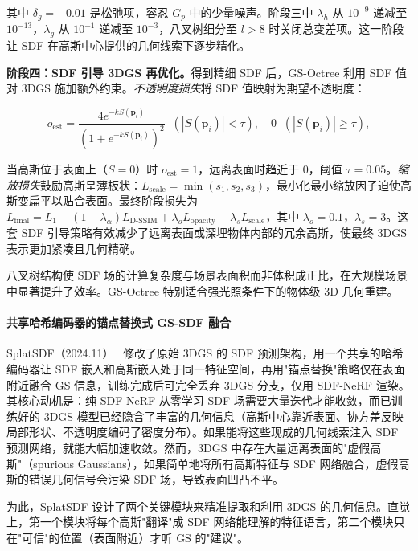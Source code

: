其中 $\delta_g{=}{-}0.01$ 是松弛项，容忍 $G_p$ 中的少量噪声。阶段三中 $\lambda_h$ 从 $10^{-9}$ 递减至 $10^{-13}$，$\lambda_g$ 从 $10^{-1}$ 递减至 $10^{-3}$，八叉树细分至 $l{>}8$ 时关闭总变差项。这一阶段让 SDF 在高斯中心提供的几何线索下逐步精化。

\textbf{阶段四：SDF 引导 3DGS 再优化。}得到精细 SDF 后，GS-Octree 利用 SDF 值对 3DGS 施加额外约束。\emph{不透明度损失}将 SDF 值映射为期望不透明度：

\begin{equation}
o_{\text{est}} = \frac{4e^{-kS(\mathbf{p}_i)}}{(1+e^{-kS(\mathbf{p}_i)})^2} \;\;(|S(\mathbf{p}_i)|<\tau), \quad 0 \;\;(|S(\mathbf{p}_i)|\geq\tau),
\end{equation}

当高斯位于表面上（$S{=}0$）时 $o_{\text{est}}{=}1$，远离表面时趋近于 0，阈值 $\tau{=}0.05$。\emph{缩放损失}鼓励高斯呈薄板状：$L_{\text{scale}} = \min(s_1, s_2, s_3)$，最小化最小缩放因子迫使高斯变扁平以贴合表面。最终阶段损失为 $L_{\text{final}} = L_1 + (1{-}\lambda_\alpha)L_{\text{D-SSIM}} + \lambda_o L_{\text{opacity}} + \lambda_s L_{\text{scale}}$，其中 $\lambda_o{=}0.1$，$\lambda_s{=}3$。这套 SDF 引导策略有效减少了远离表面或深埋物体内部的冗余高斯，使最终 3DGS 表示更加紧凑且几何精确。

八叉树结构使 SDF 场的计算复杂度与场景表面积而非体积成正比，在大规模场景中显著提升了效率。GS-Octree 特别适合强光照条件下的物体级 3D 几何重建。

\paragraph{共享哈希编码器的锚点替换式 GS-SDF 融合}

SplatSDF（2024.11）~\cite{2411_15468} 修改了原始 3DGS 的 SDF 预测架构，用一个共享的哈希编码器让 SDF 嵌入和高斯嵌入处于同一特征空间，再用"锚点替换"策略仅在表面附近融合 GS 信息，训练完成后可完全丢弃 3DGS 分支，仅用 SDF-NeRF 渲染。其核心动机是：纯 SDF-NeRF 从零学习 SDF 场需要大量迭代才能收敛，而已训练好的 3DGS 模型已经隐含了丰富的几何信息（高斯中心靠近表面、协方差反映局部形状、不透明度编码了密度分布）。如果能将这些现成的几何线索注入 SDF 预测网络，就能大幅加速收敛。然而，3DGS 中存在大量远离表面的"虚假高斯"（spurious Gaussians），如果简单地将所有高斯特征与 SDF 网络融合，虚假高斯的错误几何信号会污染 SDF 场，导致表面凹凸不平。

为此，SplatSDF 设计了两个关键模块来精准提取和利用 3DGS 的几何信息。直觉上，第一个模块将每个高斯"翻译"成 SDF 网络能理解的特征语言，第二个模块只在"可信"的位置（表面附近）才听 GS 的"建议"。

